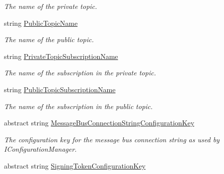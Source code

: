 \begin{DoxyCompactItemize}
\begin{DoxyCompactList}\small\item\em The name of the private topic. \end{DoxyCompactList}\item 
string \hyperlink{classCqrs_1_1Azure_1_1ServiceBus_1_1AzureServiceBus_ac6f4fbafebcde04a8493462b688e0abe_ac6f4fbafebcde04a8493462b688e0abe}{Public\+Topic\+Name}
\begin{DoxyCompactList}\small\item\em The name of the public topic. \end{DoxyCompactList}\item 
string \hyperlink{classCqrs_1_1Azure_1_1ServiceBus_1_1AzureServiceBus_a22498d51bba26c801b3b553fb451a6ae_a22498d51bba26c801b3b553fb451a6ae}{Private\+Topic\+Subscription\+Name}
\begin{DoxyCompactList}\small\item\em The name of the subscription in the private topic. \end{DoxyCompactList}\item 
string \hyperlink{classCqrs_1_1Azure_1_1ServiceBus_1_1AzureServiceBus_adab1b2f0dc9f199d5f0aa60d57ba71c8_adab1b2f0dc9f199d5f0aa60d57ba71c8}{Public\+Topic\+Subscription\+Name}
\begin{DoxyCompactList}\small\item\em The name of the subscription in the public topic. \end{DoxyCompactList}\item 
abstract string \hyperlink{classCqrs_1_1Azure_1_1ServiceBus_1_1AzureServiceBus_a2cde8078f7d4d9706dec5fb066359ee0_a2cde8078f7d4d9706dec5fb066359ee0}{Message\+Bus\+Connection\+String\+Configuration\+Key}
\begin{DoxyCompactList}\small\item\em The configuration key for the message bus connection string as used by I\+Configuration\+Manager. \end{DoxyCompactList}\item 
abstract string \hyperlink{classCqrs_1_1Azure_1_1ServiceBus_1_1AzureServiceBus_af0dd6b4f7b53b1bcb6b1e0defd6b693e_af0dd6b4f7b53b1bcb6b1e0defd6b693e}{Signing\+Token\+Configuration\+Key}

\end{DoxyCompactItemize}
